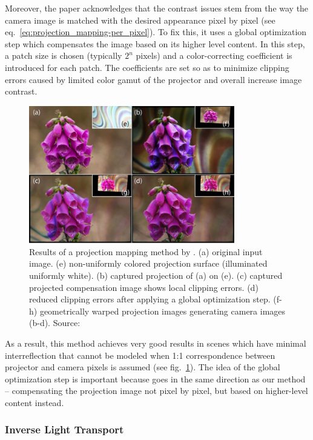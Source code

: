 Moreover, the paper acknowledges that the contrast issues stem from the way the camera image is matched with the desired appearance pixel by pixel (see eq.~\ref{eq:projection_mapping-per_pixel}). To fix this, it uses a global optimization step which compensates the image based on its higher level content. In this step, a patch size is chosen (typically \(2^n\) pixels) and a color-correcting coefficient is introduced for each patch. The coefficients are set so as to minimize clipping errors caused by limited color gamut of the projector and overall increase image contrast.

\begin{figure}
    \centering
    \includegraphics[width=0.8\textwidth]{images/02-grundhofer_result.jpg}
    \caption{Results of a projection mapping method by \citet{Grundhofer2015}. (a) original input image. (e) non-uniformly colored projection surface (illuminated  uniformly white). (b) captured projection of (a) on (e). (c) captured  projected  compensation  image shows local clipping errors. (d) reduced clipping errors after applying a global optimization step. (f-h) geometrically warped projection images generating camera images (b-d). Source: \citet{Grundhofer2015}}
    \label{fig:background_grundhofer_result}
\end{figure}

As a result, this method achieves very good results in scenes which have minimal interreflection that cannot be modeled when 1:1 correspondence between projector and camera pixels is assumed (see fig.~\ref{fig:background_grundhofer_result}). The idea of the global optimization step is important because goes in the same direction as our method -- compensating the projection image not pixel by pixel, but based on higher-level content instead.

\subsubsection{Inverse Light Transport}
\label{section:background-projection_mapping-procams-inverse_lt}

